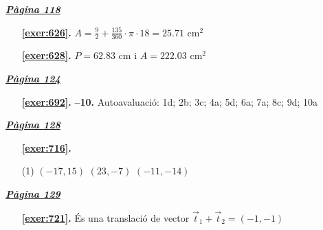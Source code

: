 \hyperlink{page.118}{\textbf{\em Pàgina 118}}
\begin{enumerate}
\item[\fontfamily{phv}\selectfont\color{blue}\textbf{\ref{exer:626}. }] \label{ans:626} 
$A=\frac {9}{2}+ \frac {135}{360} \cdot \pi \cdot 18 = 25.71$ cm$^2$
 \end{enumerate}
\begin{enumerate}
\item[\fontfamily{phv}\selectfont\color{blue}\textbf{\ref{exer:628}. }] \label{ans:628} 
$P=62.83$ cm i $A=222.03$ cm$^2$
 \end{enumerate}
\vspace{0.3cm}


\hyperlink{page.124}{\textbf{\em Pàgina 124}}
\begin{enumerate}
\item[\fontfamily{phv}\selectfont\color{blue}\textbf{\ref{exer:692}. }] \label{ans:692} 
\textbf {--10.} Autoavaluació: 1d; 2b; 3c; 4a; 5d; 6a; 7a; 8c; 9d; 10a
 \end{enumerate}

 \vspace{1cm} 
 

\vspace{0.3cm}


\hyperlink{page.128}{\textbf{\em Pàgina 128}}
\begin{enumerate}



 \item[\fontfamily{phv}\selectfont\color{blue}\textbf{\ref{exer:716}. }] \label{ans:716}
 \begin{tasks}[column-sep=1em, item-indent=1.3333em](1)
	 \task $(-17,15)$
	 \task $(23,-7)$
	 \task $(-11,-14)$
\end{tasks}
 \end{enumerate}
\vspace{0.3cm}


\hyperlink{page.129}{\textbf{\em Pàgina 129}}
\begin{enumerate}
\item[\fontfamily{phv}\selectfont\color{blue}\textbf{\ref{exer:721}. }] \label{ans:721} 
És una translació de vector $\vec t_1 + \vec t_2 = (-1,-1)$
 \end{enumerate}
\vspace{0.3cm}

